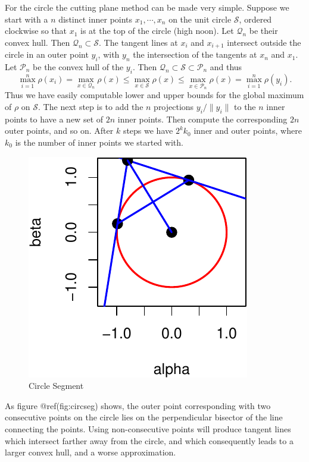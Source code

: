 \documentclass[
  12pt,
  letterpaper,
  DIV=11,
  numbers=noendperiod]{scrreprt}
\theoremstyle{remark}
\begin{document}
For the circle the cutting plane method can be made very simple. Suppose
we start with a \(n\) distinct inner points \(x_1,\cdots,x_n\) on the
unit circle \(\mathcal{S}\), ordered clockwise so that \(x_1\) is at the
top of the circle (high noon). Let \(\mathcal{Q}_n\) be their convex
hull. Then \(\mathcal{Q}_n\subset\mathcal{S}\). The tangent lines at
\(x_i\) and \(x_{i+1}\) intersect outside the circle in an outer point
\(y_i\), with \(y_n\) the intersection of the tangents at \(x_n\) and
\(x_1\). Let \(\mathcal{P}_n\) be the convex hull of the \(y_i\). Then
\(\mathcal{Q}_n\subset\mathcal{S}\subset\mathcal{P}_n\) and thus \[
\max_{i=1}^n\rho(x_i)=\max_{x\in\mathcal{Q}_n}\rho(x)\leq\max_{x\in\mathcal{S}}\rho(x)\leq\max_{x\in\mathcal{P}_n}\rho(x)=\max_{i=1}^n\rho(y_i).
\] Thus we have easily computable lower and upper bounds for the global
maximum of \(\rho\) on \(\mathcal{S}\). The next step is to add the
\(n\) projections \(y_i/\|y_i\|\) to the \(n\) inner points to have a
new set of \(2n\) inner points. Then compute the corresponding \(2n\)
outer points, and so on. After \(k\) steps we have \(2^kk_0\) inner and
outer points, where \(k_0\) is the number of inner points we started
with.

\begin{figure}[H]

{\centering \includegraphics{global_files/figure-pdf/circseg-1.pdf}

}

\caption{Circle Segment}

\end{figure}%

As figure @ref(fig:circseg) shows, the outer point corresponding with
two consecutive points on the circle lies on the perpendicular bisector
of the line connecting the points. Using non-consecutive points will
produce tangent lines which intersect farther away from the circle, and
which consequently leads to a larger convex hull, and a worse
approximation.
\end{document}
